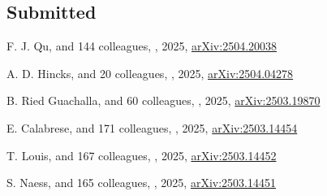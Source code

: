 

\subsection*{Submitted}

\begin{etaremune}

\item
F. J. Qu, and 144 colleagues,
,
2025, \href{https://ui.adsabs.harvard.edu/abs/2025arXiv250420038Q}{arXiv:2504.20038}

\item
A. D. Hincks, and 20 colleagues,
,
2025, \href{https://ui.adsabs.harvard.edu/abs/2025arXiv250404278H}{arXiv:2504.04278}

\item
B. Ried Guachalla, and 60 colleagues,
,
2025, \href{https://ui.adsabs.harvard.edu/abs/2025arXiv250319870R}{arXiv:2503.19870}
\submitted{\prd}

\item
E. Calabrese, and 171 colleagues,
,
2025, \href{https://ui.adsabs.harvard.edu/abs/2025arXiv250314454C}{arXiv:2503.14454}
\submitted{\jcap}

\item
T. Louis, and 167 colleagues,
,
2025, \href{https://ui.adsabs.harvard.edu/abs/2025arXiv250314452L}{arXiv:2503.14452}
\submitted{\jcap}

\item
S. Naess, and 165 colleagues,
,
2025, \href{https://ui.adsabs.harvard.edu/abs/2025arXiv250314451N}{arXiv:2503.14451}
\submitted{\jcap}


\end{etaremune}

